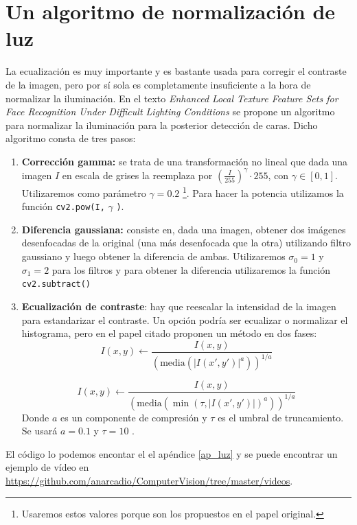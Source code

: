 \documentclass[a4paper,openright, 12pt]{book}
\begin{document}
\section{Un algoritmo de normalización de luz}
La ecualización es muy importante y es bastante usada para corregir el contraste de la imagen, pero por sí sola es completamente insuficiente a la hora de normalizar la iluminación. En el texto \textit{Enhanced Local Texture Feature Sets for Face Recognition Under Difficult Lighting Conditions} \cite{illuFace} se propone un algoritmo para normalizar la iluminación para la posterior detección de caras.
\newline
Dicho algoritmo consta de tres pasos:
\begin{enumerate}
\item \textbf{Corrección gamma:} 
se trata de una transformación no lineal que dada una imagen $I$ en escala de grises la reemplaza por ${(\frac{I}{255})}^{\gamma}\cdot255$, con $\gamma \in [0,1]$. Utilizaremos como parámetro $\gamma = 0.2$ \footnote{Usaremos estos valores porque son los propuestos en el papel original.}. Para hacer la potencia utilizamos la función \lstinline|cv2.pow(I,| $\gamma$ \lstinline|)|.

\item \textbf{Diferencia gaussiana:} consiste en, dada una imagen, obtener dos imágenes desenfocadas de la original (una más desenfocada que la otra) utilizando filtro gaussiano y luego obtener la diferencia de ambas. Utilizaremos $\sigma_0 =1$ y $\sigma_1=2$ para los filtros y para obtener la diferencia utilizaremos la función \lstinline|cv2.subtract()|

\item \textbf{Ecualización de contraste}: hay que reescalar la intensidad de la imagen para estandarizar el contraste. Un opción podría ser ecualizar o normalizar el histograma, pero en el papel citado proponen un método en dos fases:
\begin{equation}
I(x,y) \leftarrow \frac{I(x,y)}{ {(\text{media}(|I(x',y')|^a))}^{1/a}}
\end{equation}

\begin{equation}
I(x,y) \leftarrow \frac{I(x,y)}{ {(\text{media}({\min(\tau, |I(x',y')|)}^a))}^{1/a}}
\end{equation}
Donde $a$ es un componente de compresión y $\tau$ es el umbral de truncamiento. Se usará $a=0.1$ y $\tau=10$ \footnotemark[\value{footnote}].
\end{enumerate}
El código lo podemos encontar el el apéndice \ref{ap_luz} y se puede encontrar un ejemplo de vídeo en \url{https://github.com/anarcadio/ComputerVision/tree/master/videos}.
\end{document}
